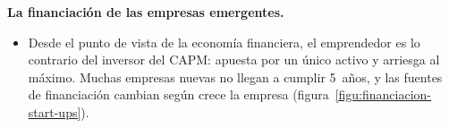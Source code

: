\documentclass[11pt]{article}
\begin{document}
\begin{anotaciones}
\textbf{La financiación de las empresas emergentes.}
\begin{itemize}
\item Desde el punto de vista de la economía financiera, el emprendedor es lo contrario del inversor del CAPM: apuesta por un único activo y arriesga al máximo. Muchas empresas nuevas no llegan a cumplir 5~años, y las fuentes de financiación cambian según crece la empresa (figura~\ref{figu:financiacion-start-ups}).
\end{itemize}

\begin{infografiacaja}
\centering
\caption{Fuentes de financiación de la empresa según crece}\label{figu:financiacion-start-ups}
\end{infografiacaja}


\end{anotaciones}
\end{document}

